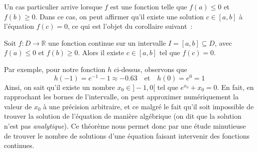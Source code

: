 Un cas particulier arrive lorsque $f$ est une fonction telle que $f(a) \leq 0$ et $f(b) \geq 0$. Dans ce cas, on peut affirmer qu'il existe une solution $c \in [a, b]$ à l'équation $f(c) = 0$, ce qui est l'objet du corollaire suivant~:
\begin{boxcorollary}
Soit $f : D \to \mathbb{R}$ une fonction continue sur un intervalle $I = [a, b] \subseteq D$, avec $f(a) \leq 0$ et $f(b) \geq 0$. Alors il existe $c \in [a, b]$ tel que
$f(c) = 0$.
\end{boxcorollary}
Par exemple, pour notre fonction $h$ ci-dessus, observons que
\begin{equation}
h(-1) = e^{-1} - 1 \approx -0.63 \quad \textrm{et} \quad h(0) = e^0 = 1
\end{equation}
Ainsi, on sait qu'il existe un nombre $x_0 \in ]-1, 0[$ tel que $e^{x_0} + x_0 = 0$. En fait, en rapprochant les bornes de l'intervalle, on peut approximer numériquement la valeur de $x_0$ à une précision arbitraire, et ce malgré le fait qu'il soit impossible de trouver la solution de l'équation de manière algébrique (on dit que la solution n'est pas \emph{analytique}). Ce théorème nous permet donc par une étude minutieuse de trouver le nombre de solutions d'une équation faisant intervenir des fonctions continues.